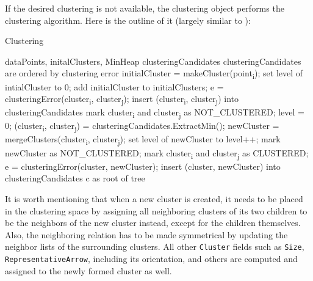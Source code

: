 If the desired clustering is not available, the clustering object performs the clustering algorithm. Here is the outline of it (largely similar to \citet{Telea99}):

\begin{algorithm}[H]
\caption{Clustering}
\begin{algorithmic}[1]

\Require dataPoints, initalClusters, MinHeap clusteringCandidates \Comment clusteringCandidates are ordered by clustering error
\Statex
{}
	\State initialCluster = makeCluster(point\textsubscript{i});
    \State set level of intialCluster to 0;
    \State add initialCluster to initialClusters;
\EndFor
\Statex
{}
    	\State e = clusteringError(cluster\textsubscript{i}, cluster\textsubscript{j});
        \State insert (cluster\textsubscript{i}, cluster\textsubscript{j}) into clusteringCandidates
        \State mark cluster\textsubscript{i} and cluster\textsubscript{j} as NOT\_CLUSTERED;
    \EndFor
\EndFor
\Statex
\State level = 0;
	\State (cluster\textsubscript{i}, cluster\textsubscript{j}) = clusteringCandidates.ExtractMin();
    	\State newCluster = mergeClusters(cluster\textsubscript{i}, cluster\textsubscript{j});
        \State set level of newCluster to level++;
		\State mark newCluster as NOT\_CLUSTERED;
        \State mark cluster\textsubscript{i} and cluster\textsubscript{j} as CLUSTERED;
        	\State e = clusteringError(cluster, newCluster);
            \State insert (cluster, newCluster) into clusteringCandidates
        \EndFor
    \EndIf
\EndWhile
\Statex
\Return c as root of tree
\end{algorithmic}
\end{algorithm}

It is worth mentioning that when a new cluster is created, it needs to be placed in the clustering space by assigning all neighboring clusters of its two children to be the neighbors of the new cluster instead, except for the children themselves. Also, the neighboring relation has to be made symmetrical by updating the neighbor lists of the surrounding clusters. All other \verb+Cluster+ fields such as \verb+Size+, \verb+RepresentativeArrow+, including its orientation, and others are computed and assigned to the newly formed cluster as well.

